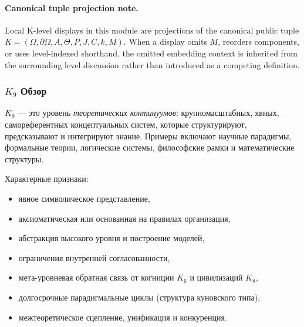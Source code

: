 



\paragraph{Canonical tuple projection note.}
Local K-level displays in this module are projections of the canonical public tuple \(K=(\Omega,\partial\Omega,A,\Theta,P,J,C,k,M)\). When a display omits \(M\), reorders components, or uses level-indexed shorthand, the omitted embedding context is inherited from the surrounding level discussion rather than introduced as a competing definition.

\subsubsection{\texorpdfstring{$K_9$}{K_9} Обзор}
\label{sec:k9-overview}

$K_9$ — это уровень \emph{теоретических континуумов}: крупномасштабных, явных,
самореферентных концептуальных систем, которые структурируют, предсказывают и интегрируют
знание. Примеры включают научные парадигмы, формальные теории, логические
системы, философские рамки и математические структуры.

Характерные признаки:
\begin{itemize}
    \item явное символическое представление,
    \item аксиоматическая или основанная на правилах организация,
    \item абстракция высокого уровня и построение моделей,
    \item ограничения внутренней согласованности,
    \item мета-уровневая обратная связь от когниции $K_6$ и цивилизаций $K_8$,
    \item долгосрочные парадигмальные циклы (структура куновского типа),
    \item межтеоретическое сцепление, унификация и конкуренция.
\end{itemize}

